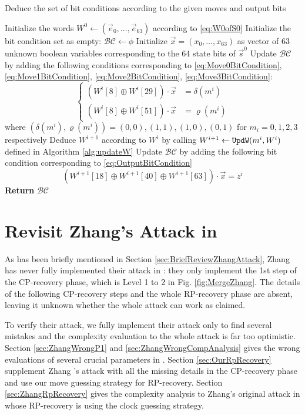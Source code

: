 \begin{algorithm}[htbp]
	\caption{Deduce the set of bit conditions according to the given moves and output bits} \label{alg:getBC}
	\begin{algorithmic}[1]
\State Initialize the words $W^0\leftarrow (\vec e_0,\ldots, \vec e_{63})$ according to \eqref{eq:W0ofS0}
\State Initialize the bit condition set as empty: $\mathcal{BC}\leftarrow \phi$
\State Initialize $\vec{x}=(x_0,\ldots, x_{63})$ as vector of 63 unknown boolean variables corresponding to the 64 state bits of $\vec s^0$
\State Update $\mathcal{BC}$ by adding the following conditions corresponding to \eqref{eq:Move0BitCondition}, \eqref{eq:Move1BitCondition}, \eqref{eq:Move2BitCondition}, \eqref{eq:Move3BitCondition}:
\[
\left\{
\begin{aligned}
(W^i[8]\oplus W^i[29])\cdot \vec x&=\delta(m^i)\\
(W^i[8]\oplus W^i[51])\cdot \vec x&=\varrho(m^i)
\end{aligned}
\right.
\]
where $(\delta(m^i), \varrho(m^i))=(0,0),(1,1),(1,0),(0,1)$ for $m_i=0,1,2,3$ respectively
\EndIf
\State Deduce $W^{i+1}$ according to $W^{i}$ by calling $W^{i+1}\leftarrow {\tt UpdW}(m^i,W^i)$ defined in Algorithm \ref{alg:updateW}
\State Update $\mathcal{BC}$ by adding the following bit condition corresponding to \eqref{eq:OutputBitCondition}
\[
(W^{i+1}[18]\oplus W^{i+1}[40]\oplus W^{i+1}[63])\cdot \vec x =z^i
\]
\EndFor
\State \textbf{Return} $\mathcal{BC}$
		\EndProcedure
	\end{algorithmic}
\end{algorithm}


\section{Revisit Zhang's Attack in \cite{AC:Zhang19}}
As has been briefly mentioned in Section \ref{sec:BriefReviewZhangAttack}, Zhang \etal has never fully implemented their attack in \cite{AC:Zhang19}: 
they only implement the 1st step of the CP-recovery phase, which is Level 1 to 2 in Fig. \ref{fig:MergeZhang}. 
The details of the following CP-recovery steps and the whole RP-recovery phase are absent, leaving it unknown whether the whole attack can work as claimed. 

To verify their attack, we fully implement their attack only to find several mistakes and the complexity evaluation to the whole attack is far too optimistic. 
Section \ref{sec:ZhangWrongP1} and \ref{sec:ZhangWrongCompAnalysis} gives the wrong evaluations of several crucial parameters in \cite{AC:Zhang19}. 
Section \ref{sec:OurRpRecovery} supplement Zhang \etal's attack with all the missing details in the CP-recovery phase and use our move guessing strategy for RP-recovery. 
Section \ref{sec:ZhangRpRecovery} gives the complexity analysis to Zhang's original attack in \cite{AC:Zhang19} whose RP-recovery is using the clock guessing strategy. 

